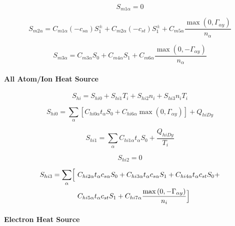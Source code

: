 \documentclass[a4paper,10pt]{report}
\begin{document}
\begin{equation}
S_{m1\alpha}=0   \label{26}
\end{equation}

\begin{equation}
S_{m2\alpha}=C_{m1\alpha}\left( -c_{s\alpha}\right) S_{1}^{\pm}+C_{m2\alpha}
\left( -c_{st}\right) S_{1}^{\pm}+C_{m5\alpha}
\frac{\max\left(0,\Gamma_{\alpha y}\right) }{n_{\alpha}}   \label{27}
\end{equation}

\begin{equation}
S_{m3\alpha}=C_{m3\alpha}S_{0}+C_{m4\alpha}S_{1}+C_{m6\alpha}
\frac{\max\left( 0,-\Gamma_{\alpha y}\right) }{n_{\alpha}}   \label{28}
\end{equation}

\paragraph{All Atom/Ion Heat Source}

\begin{equation}
S_{hi}=S_{hi0}+S_{hi1}T_{i}+S_{hi2}n_{i}+S_{hi3}n_{i}T_{i}   \label{29}
\end{equation}

\begin{equation}
S_{hi0}=\sum_{\alpha}\left[ C_{hi0\alpha}t_{\alpha}S_{0}+C_{hi6\alpha}
\max\left( 0,\Gamma_{\alpha y}\right) \right] +Q_{hiDy}   \label{30}
\end{equation}

\begin{equation}
S_{hi1}=\sum_{\alpha}C_{hi1\alpha}t_{\alpha}S_{0}+\frac{Q_{hiDy}}{T_i}   \label{31}
\end{equation}

\begin{equation}
S_{hi2}=0   \label{32}
\end{equation}

\begin{equation}\begin{split}
S_{hi3}=\sum_{\alpha}\Bigl[ ~ & C_{hi2\alpha}t_{\alpha}c_{s\alpha}S_{0}+C_{hi3\alpha}
t_{\alpha}c_{s\alpha}S_{1}+C_{hi4\alpha}t_{\alpha}c_{st}S_{0}+  \\
~ & C_{hi5\alpha}t_{\alpha}c_{st}S_{1}+C_{hi7\alpha}
\frac{\max\left(0,-\Gamma_{\alpha y}\right) }{n_{i}}\Bigr]   \label{33}
\end{split}\end{equation}

\paragraph{Electron Heat Source}
\end{document}
